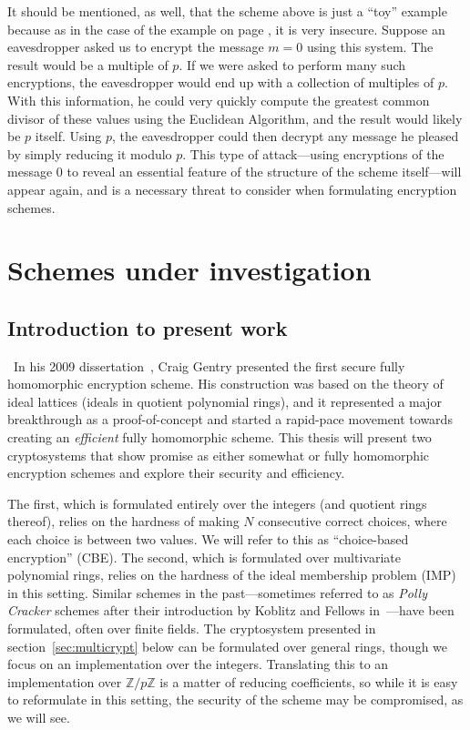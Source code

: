\documentclass[11pt]{report}
\newcommand{\Z}{\mathbb{Z}}
\begin{document}
It should be mentioned, as well, that the scheme above is just a ``toy'' example because as in the case of the example on page \pageref{Example1}, it is very insecure. Suppose an eavesdropper asked us to encrypt the message $m=0$ using this system. The result would be a multiple of $p$. If we were asked to perform many such encryptions, the eavesdropper would end up with a collection of multiples of $p$. With this information, he could very quickly compute the greatest common divisor of these values using the Euclidean Algorithm, and the result would likely be $p$ itself. Using $p$, the eavesdropper could then decrypt any message he pleased by simply reducing it modulo $p$. This type of attack---using encryptions of the message $0$ to reveal an essential feature of the structure of the scheme itself---will appear again, and is a necessary threat to consider when formulating encryption schemes.

\chapter{Schemes under investigation}

\section{Introduction to present work}

\
In his 2009 dissertation~\cite{gentry-thesis}, Craig Gentry presented the first secure fully homomorphic encryption scheme. His construction was based on the theory of ideal lattices (ideals in quotient polynomial rings), and it represented a major breakthrough as a proof-of-concept and started a rapid-pace movement towards creating an \emph{efficient} fully homomorphic scheme. This thesis will present two cryptosystems that show promise as either somewhat or fully homomorphic encryption schemes and explore their security and efficiency.

The first, which is formulated entirely over the integers (and quotient rings thereof), relies on the hardness of making $N$ consecutive correct choices, where each choice is between two values. We will refer to this as ``choice-based encryption'' (CBE). The second, which is formulated over multivariate polynomial rings, relies on the hardness of the ideal membership problem (IMP) in this setting. Similar schemes in the past---sometimes referred to as \emph{Polly Cracker} schemes after their introduction by Koblitz and Fellows in~\cite{fellows-koblitz}---have been formulated, often over finite fields. The cryptosystem presented in section~\ref{sec:multicrypt}  below can be formulated over general rings, though we focus on an implementation over the integers. Translating this to an implementation over $\Z/p\Z$ is a matter of reducing coefficients, so while it is easy to reformulate in this setting, the security of the scheme may be compromised, as we will see.
\end{document}
